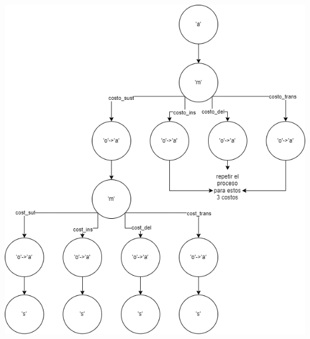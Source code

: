  \begin{minipage}[t]{0.5\textwidth}
    \includegraphics[width=\textwidth]{images/ejemplo_fuerza_bruta.png}
 \end{minipage}